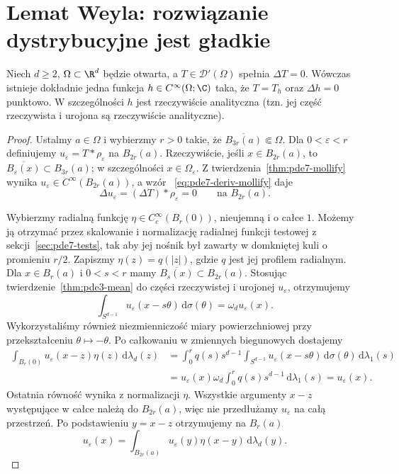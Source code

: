 \section{Lemat Weyla: rozwiązanie dystrybucyjne jest gładkie}
\label{sec:pde7-weyl}

\begin{twierdzenie}
\label{thm:pde7-weyl}
Niech $d\ge2$, $\Omega\subset\R^d$ będzie otwarta,
a $T\in\mathcal D'(\Omega)$ spełnia $\Delta T=0$.
Wówczas istnieje dokładnie jedna funkcja
$h\in C^\infty(\Omega;\C)$ taka, że $T=T_h$
oraz $\Delta h=0$ punktowo.
W szczególności $h$ jest rzeczywiście analityczna
(tzn. jej część rzeczywista i urojona są
rzeczywiście analityczne).
\end{twierdzenie}
\begin{proof}
Ustalmy $a\in\Omega$ i wybierzmy $r>0$ takie, że
$\overline{B_{3r}(a)}\Subset\Omega$.
Dla $0<\varepsilon<r$ definiujemy
$u_\varepsilon=T*\rho_\varepsilon$ na $B_{2r}(a)$.
Rzeczywiście, jeśli $x\in B_{2r}(a)$, to
$\overline{B_\varepsilon(x)}\subset B_{3r}(a)$;
w szczególności $x\in\Omega_\varepsilon$.
Z twierdzenia~\ref{thm:pde7-mollify} wynika
$u_\varepsilon\in C^\infty(B_{2r}(a))$, a wzór
~\eqref{eq:pde7-deriv-mollify} daje
\[
 \Delta u_\varepsilon=(\Delta T)*\rho_\varepsilon=0
 \qquad\text{na }B_{2r}(a).
\]

Wybierzmy radialną funkcję
$\eta\in C_c^\infty(B_r(0))$, nieujemną i o całce $1$.
Możemy ją otrzymać przez skalowanie i normalizację
radialnej funkcji testowej z sekcji~\ref{sec:pde7-tests},
tak aby jej nośnik był zawarty w domkniętej kuli
o promieniu $r/2$.
Zapiszmy $\eta(z)=q(|z|)$, gdzie $q$ jest jej
profilem radialnym. Dla $x\in B_r(a)$ i $0<s<r$
mamy $\overline{B_s(x)}\subset B_{2r}(a)$.
Stosując twierdzenie~\ref{thm:pde3-mean}
do części rzeczywistej i urojonej $u_\varepsilon$,
otrzymujemy
\[
 \int_{S^{d-1}}u_\varepsilon(x-s\theta)\,
 \mathrm d\sigma(\theta)
 =\omega_d u_\varepsilon(x).
\]
Wykorzystaliśmy również niezmienniczość miary
powierzchniowej przy przekształceniu
$\theta\mapsto-\theta$.
Po całkowaniu w zmiennych biegunowych dostajemy
\[
\begin{aligned}
 \int_{B_r(0)}u_\varepsilon(x-z)\eta(z)\,
 \mathrm d\lambda_d(z)
 &=\int_0^r q(s)s^{d-1}
 \int_{S^{d-1}}u_\varepsilon(x-s\theta)\,
 \mathrm d\sigma(\theta)\,\mathrm d\lambda_1(s)\\
 &=u_\varepsilon(x)\omega_d
 \int_0^r q(s)s^{d-1}\,\mathrm d\lambda_1(s)
 =u_\varepsilon(x).
\end{aligned}
\]
Ostatnia równość wynika z normalizacji $\eta$.
Wszystkie argumenty $x-z$ występujące w całce
należą do $B_{2r}(a)$, więc nie przedłużamy
$u_\varepsilon$ na całą przestrzeń.
Po podstawieniu $y=x-z$ otrzymujemy na $B_r(a)$
\[
 u_\varepsilon(x)=
 \int_{B_{2r}(a)}u_\varepsilon(y)\eta(x-y)\,
 \mathrm d\lambda_d(y).
\]


\end{proof}
